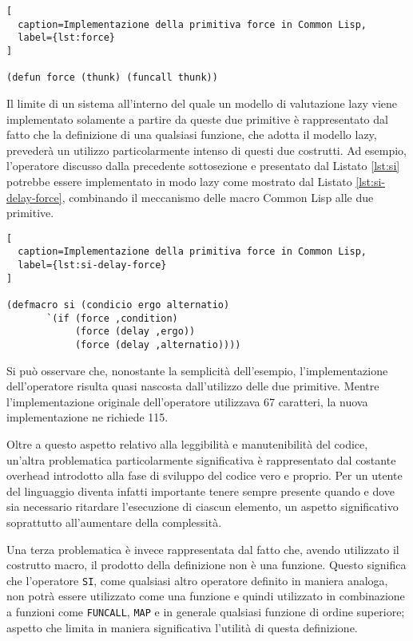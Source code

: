 \begin{lstlisting}[
  caption=Implementazione della primitiva force in Common Lisp,
  label={lst:force}
]

(defun force (thunk) (funcall thunk))

\end{lstlisting}

Il limite di un sistema all'interno del quale un modello di valutazione lazy
viene implementato solamente a partire da queste due primitive è rappresentato
dal fatto che la definizione di una qualsiasi funzione, che adotta il modello
lazy, prevederà un utilizzo particolarmente intenso di questi due costrutti. Ad
esempio, l'operatore discusso dalla precedente sottosezione e presentato dal
Listato \ref{lst:si} potrebbe essere implementato in modo lazy come mostrato dal
Listato \ref{lst:si-delay-force}, combinando il meccanismo delle macro Common
Lisp alle due primitive.

\begin{lstlisting}[
  caption=Implementazione della primitiva force in Common Lisp,
  label={lst:si-delay-force}
]

(defmacro si (condicio ergo alternatio)
       `(if (force ,condition)
            (force (delay ,ergo))
            (force (delay ,alternatio))))

\end{lstlisting}

Si può osservare che, nonostante la semplicità dell'esempio, l'implementazione
dell'operatore risulta quasi nascosta dall'utilizzo delle due primitive. Mentre
l'implementazione originale dell'operatore utilizzava 67 caratteri, la nuova
implementazione ne richiede 115.

Oltre a questo aspetto relativo alla leggibilità e manutenibilità del codice,
un'altra problematica particolarmente significativa è rappresentato dal costante
overhead introdotto alla fase di sviluppo del codice vero e proprio. Per un
utente del linguaggio diventa infatti importante tenere sempre presente quando e
dove sia necessario ritardare l'esecuzione di ciascun elemento, un aspetto
significativo soprattutto all'aumentare della complessità.

Una terza problematica è invece rappresentata dal fatto che, avendo utilizzato
il costrutto macro, il prodotto della definizione non è una funzione. Questo
significa che l'operatore \texttt{SI}, come qualsiasi altro operatore definito
in maniera analoga, non potrà essere utilizzato come una funzione e quindi
utilizzato in combinazione a funzioni come \texttt{FUNCALL}, \texttt{MAP} e in
generale qualsiasi funzione di ordine superiore; aspetto che limita in maniera
significativa l'utilità di questa definizione.\\


